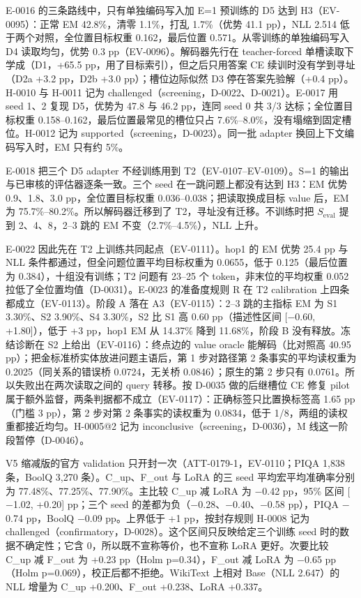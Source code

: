 \documentclass[11pt]{article}
\begin{document}
E-0016 的三条路线中，只有单独编码写入加 E=1 预训练的 D5 达到 H3（EV-0095）：正常 EM 42.8\%，清零 1.1\%，打乱 1.7\%（优势 41.1 pp），NLL 2.514 低于两个对照，全位置目标权重 0.162，最后位置 0.571。从零训练的单独编码写入 D4 读取均匀，优势 0.3 pp（EV-0096）。解码器先行在 teacher-forced 单槽读取下学成（D1，+65.5 pp，用了目标索引），但之后只用答案 CE 续训时没有学到寻址（D2a +3.2 pp，D2b +3.0 pp）；槽位边际似然 D3 停在答案先验解（+0.4 pp）。H-0010 与 H-0011 记为 challenged（screening，D-0022、D-0021）。E-0017 用 seed 1、2 复现 D5，优势为 47.8 与 46.2 pp，连同 seed 0 共 3/3 达标；全位置目标权重 0.158--0.162，最后位置最常见的槽位只占 7.6\%--8.0\%，没有塌缩到固定槽位。H-0012 记为 supported（screening，D-0023）。同一批 adapter 换回上下文编码写入时，EM 只有约 5\%。

E-0018 把三个 D5 adapter 不经训练用到 T2（EV-0107--EV-0109）。S=1 的输出与已审核的评估器逐条一致。三个 seed 在一跳问题上都没有达到 H3：EM 优势 0.9、1.8、3.0 pp，全位置目标权重 0.036--0.038；把读取换成目标 value 后，EM 为 75.7\%--80.2\%。所以解码器迁移到了 T2，寻址没有迁移。不训练时把 $S_\text{eval}$ 提到 2、4、8，2--3 跳的 EM 不变（2.7\%--4.5\%），NLL 上升。

E-0022 因此先在 T2 上训练共同起点（EV-0111）。hop1 的 EM 优势 25.4 pp 与 NLL 条件都通过，但全问题位置平均目标权重为 0.0655，低于 0.125（最后位置为 0.384），十组没有训练；T2 问题有 23--25 个 token，非末位的平均权重 0.052 拉低了全位置均值（D-0031）。E-0023 的准备度规则 R 在 T2 calibration 上四条都成立（EV-0113）。阶段 A 落在 A3（EV-0115）：2--3 跳的主指标 EM 为 S1 3.30\%、S2 3.90\%、S4 3.30\%，S2 比 S1 高 0.60 pp（描述性区间 [$-$0.60, +1.80]），低于 +3 pp，hop1 EM 从 14.37\% 降到 11.68\%，阶段 B 没有释放。冻结诊断在 S2 上给出（EV-0116）：终点边的 value oracle 能解码（比对照高 40.95 pp）；把金标准桥实体放进问题主语后，第 1 步对路径第 2 条事实的平均读权重为 0.2025（同关系的错误桥 0.0724，无关桥 0.0846）；原生的第 2 步只有 0.0761。所以失败出在两次读取之间的 query 转移。按 D-0035 做的后继槽位 CE 修复 pilot 属于额外监督，两条判据都不成立（EV-0117）：正确标签只比置换标签高 1.65 pp（门槛 3 pp），第 2 步对第 2 条事实的读权重为 0.0834，低于 1/8，两组的读权重都接近均匀。H-0005@2 记为 inconclusive（screening，D-0036），M 线这一阶段暂停（D-0046）。

V5 缩减版的官方 validation 只开封一次（ATT-0179-1，EV-0110；PIQA 1,838 条，BoolQ 3,270 条）。C\_up、F\_out 与 LoRA 的三 seed 平均宏平均准确率分别为 77.48\%、77.25\%、77.90\%。主比较 C\_up 减 LoRA 为 $-$0.42 pp，95\% 区间 [$-$1.02, +0.20] pp；三个 seed 的差都为负（$-$0.28、$-$0.40、$-$0.58 pp），PIQA $-$0.74 pp，BoolQ $-$0.09 pp。上界低于 +1 pp，按封存规则 H-0008 记为 challenged（confirmatory，D-0028）。这个区间只反映给定三个训练 seed 时的数据不确定性；它含 0，所以既不宣称等价，也不宣称 LoRA 更好。次要比较 C\_up 减 F\_out 为 +0.23 pp（Holm p=0.34），F\_out 减 LoRA 为 $-$0.65 pp（Holm p=0.069），校正后都不拒绝。WikiText 上相对 Base（NLL 2.647）的 NLL 增量为 C\_up +0.200、F\_out +0.238、LoRA +0.337。
\end{document}
